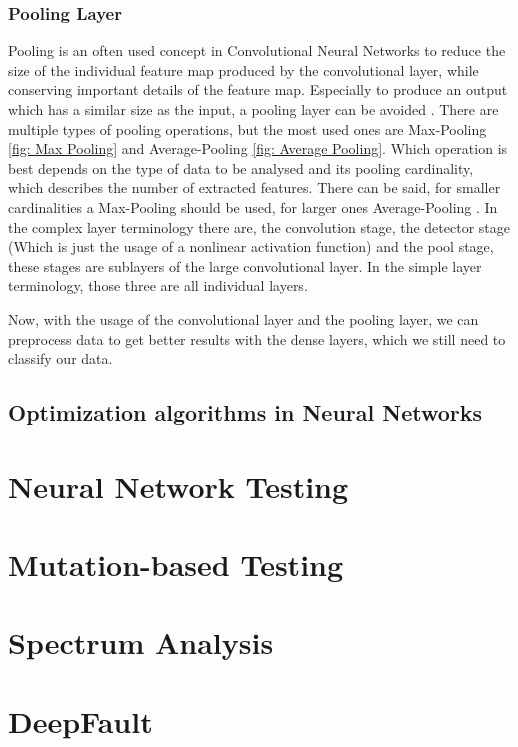 \subsubsection{Pooling Layer}
Pooling is an often used concept in Convolutional Neural Networks to reduce the size of the individual feature map produced by the convolutional layer, while conserving important details of the feature map.
Especially to produce an output which has a similar size as the input, a pooling layer can be avoided \cite{jain_supervised_2007}.
There are multiple types of pooling operations, but the most used ones are Max-Pooling \ref{fig: Max Pooling} and Average-Pooling \ref{fig: Average Pooling}.
Which operation is best depends on the type of data to be analysed and its pooling cardinality, which describes the number of extracted features.
There can be said, for smaller cardinalities a Max-Pooling should be used, for larger ones Average-Pooling \cite{boureau_theoretical_2010}.
In the complex layer terminology \cite{goodfellow_deep_2016} there are, the convolution stage, the detector stage (Which is just the usage of a nonlinear activation function) and the pool stage, these stages are sublayers of the large convolutional layer.
In the simple layer terminology, those three are all individual layers.


Now, with the usage of the convolutional layer and the pooling layer, we can preprocess data to get better results with the dense layers, which we still need to classify our data.
\subsection{Optimization algorithms in Neural Networks}\label{subsec:optimization-in-neural-networks}
\section{Neural Network Testing}\label{sec:neural-network-testing}
\lipsum[21-25]
\section{Mutation-based Testing}\label{sec:mutation-based-testing}
\lipsum[26-30]
\section{Spectrum Analysis}\label{sec:spectrum-analysis}
\lipsum[31-35]
\section{DeepFault}\label{sec:deepfault}\cite{wong_dstar_2014}
\lipsum[36-40]